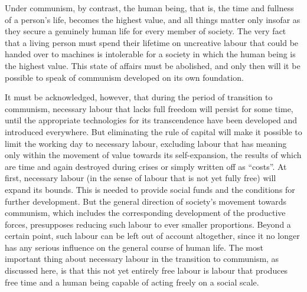 \documentclass[../main]{subfiles}
\begin{document}
Under communism, by contrast, the human being, that is, the time and fullness of a person’s life, becomes the highest value, and all things matter only insofar as they secure a genuinely human life for every member of society. The very fact that a living person must spend their lifetime on uncreative labour that could be handed over to machines is intolerable for a society in which the human being is the highest value. This state of affairs must be abolished, and only then will it be possible to speak of communism developed on its own foundation.

It must be acknowledged, however, that during the period of transition to communism, necessary labour that lacks full freedom will persist for some time, until the appropriate technologies for its transcendence have been developed and introduced everywhere. But eliminating the rule of capital will make it possible to limit the working day to necessary labour, excluding labour that has meaning only within the movement of value towards its self-expansion, the results of which are time and again destroyed during crises or simply written off as “costs”. At first, necessary labour (in the sense of labour that is not yet fully free) will expand its bounds. This is needed to provide social funds and the conditions for further development. But the general direction of society’s movement towards communism, which includes the corresponding development of the productive forces, presupposes reducing such labour to ever smaller proportions. Beyond a certain point, such labour can be left out of account altogether, since it no longer has any serious influence on the general course of human life. The most important thing about necessary labour in the transition to communism, as discussed here, is that this not yet entirely free labour is labour that produces free time and a human being capable of acting freely on a social scale.
\end{document}

